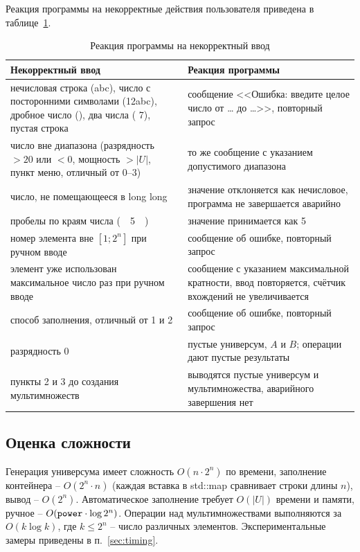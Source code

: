 \documentclass[14pt,a4paper]{extreport}
\newcommand{\card}[1]{\left|#1\right|}
\newcommand{\code}[1]{{\ttfamily #1}}
\begin{document}
Реакция программы на некорректные действия пользователя приведена в таблице~\ref{tab:errors}.

\begin{table}[H]
\caption{Реакция программы на некорректный ввод}\label{tab:errors}
\small\singlespacing
\begin{tabularx}{\textwidth}{@{}>{\raggedright\arraybackslash}p{6.3cm}X@{}}
\toprule
Некорректный ввод & Реакция программы \\
\midrule
нечисловая строка (\code{abc}), число с посторонними символами (\code{12abc}), дробное число (\code{1.5}), два числа (\code{3 7}), пустая строка & сообщение <<Ошибка: введите целое число от \ldots{} до \ldots{}>>, повторный запрос \\
число вне диапазона (разрядность $>20$ или $<0$, мощность $>\card{U}$, пункт меню, отличный от 0--3) & то же сообщение с указанием допустимого диапазона \\
число, не помещающееся в \code{long long} & значение отклоняется как нечисловое, программа не завершается аварийно \\
пробелы по краям числа (\code{\ \ 5\ \ }) & значение принимается как 5 \\
номер элемента вне $[1;2^n]$ при ручном вводе & сообщение об ошибке, повторный запрос \\
элемент уже использован максимальное число раз при ручном вводе & сообщение с указанием максимальной кратности, ввод повторяется, счётчик вхождений не увеличивается \\
способ заполнения, отличный от 1 и 2 & сообщение об ошибке, повторный запрос \\
разрядность 0 & пустые универсум, $A$ и $B$; операции дают пустые результаты \\
пункты 2 и 3 до создания мультимножеств & выводятся пустые универсум и мультимножества, аварийного завершения нет \\
\bottomrule
\end{tabularx}
\end{table}

\subsection{Оценка сложности}

Генерация универсума имеет сложность $O(n\cdot 2^n)$ по времени, заполнение контейнера -- $O(2^n\cdot n)$ (каждая вставка в \code{std::map} сравнивает строки длины $n$), вывод -- $O(2^n)$. Автоматическое заполнение требует $O(\card{U})$ времени и памяти, ручное -- $O(\text{\code{power}}\cdot\log 2^n)$. Операции над мультимножествами выполняются за $O(k\log k)$, где $k\le 2^n$ -- число различных элементов. Экспериментальные замеры приведены в п.~\ref{sec:timing}.
\end{document}
